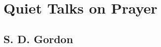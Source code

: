 \documentclass[12pt]{book}
\begin{document}
\frontmatter
%
\chapter*{\Huge \center Quiet Talks on Prayer }
\thispagestyle{empty}
\section*{\huge \center S. D. Gordon}
%
\tableofcontents
%
\mainmatter
%
%


%
\backmatter
%
\end{document}
